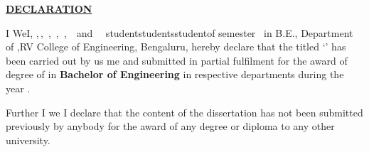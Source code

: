 
\thispagestyle{empty}
\vspace{-0.75cm}
\begin{center}
\Large\textbf{\underline{DECLARATION}} \par
\end{center}


\noindent \ifPG I \else \ifStuNameBUsed We\else I\fi\fi, \textbf{\printStuNameA}\ifPG ,$\,$\else\ifStuNameBUsed\ifStuNameCUsed,$\,$ \fi \textbf{\printStuNameB}\ifStuNameCUsed \ifStuNameDUsed,$\,$ \fi \textbf{\printStuNameC}\ifStuNameDUsed\ifStuNameEUsed\ifIDP,$\,$ \fi\fi \textbf{\printStuNameD}\ifIDP\ifStuNameEUsed\ifStuNameFUsed,$\,$ \fi \textbf{\printStuNameE}$\,$ \ifStuNameDUsed and $\,$ \textbf{\printStuNameF}$\,$ \fi \fi \fi \fi \fi \fi \fi \ifPG student\space \else \ifStuNameBUsed\space students\space\else\space student\space\fi\fi of \ifPG {}  \fi \else {} \else {} \else {}\fi \fi\fi\fi semester \ifPG \printMastersInSF\, in \printMastersPrgName \else B.E.\fi, \ifIDP \else Department of \printDepartmentLF,\fi RV College of Engineering, Bengaluru, hereby declare that the  \else {} \else {}\fi\fi\fi titled `\textbf{\printTitle}' has been carried out by \ifStuNameBUsed us \else me \fi and submitted in partial fulfilment for the award of degree of \ifPG \textbf{\printMastersInLF} in \textbf{\printMastersPrgName} \else\textbf{Bachelor of Engineering} in \ifIDP respective departments \else  \textbf{\printDepartmentLF} \fi\fi during the year \printAcadYear.\\ \par

\noindent Further \ifPG I \else\ifStuNameBUsed we \else I \fi \fi declare that the content of the dissertation has not been submitted previously by anybody for the award of any degree or diploma to any other university.\\ \par


